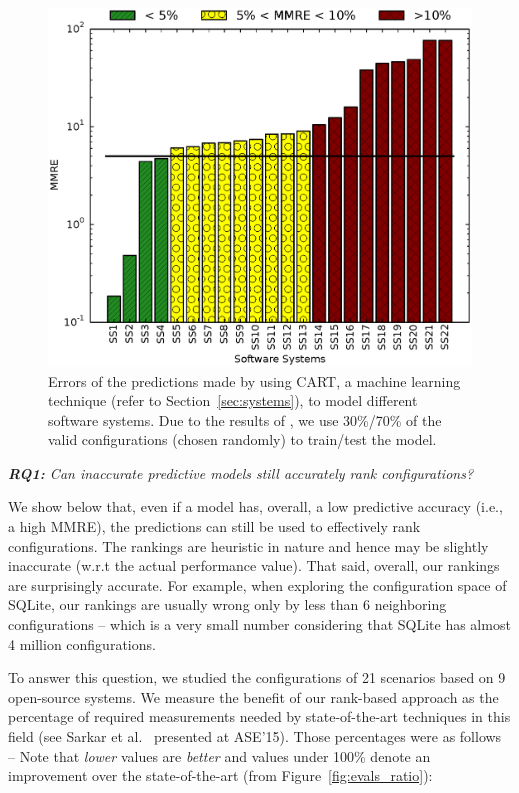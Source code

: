 \begin{figure}[t]
\centering
\includegraphics[scale=0.35]{Figures/figure1}
\caption{{\small Errors of the predictions made by using CART, a machine learning technique (refer to Section~\ref{sec:systems}), to model different
software systems. Due to the results of , we use  30\%/70\% of the  valid configurations (chosen randomly) to train/test the model. }
}
\label{fig:model_efficiency}
\end{figure}


  \noindent
  {\em  {\bf RQ1:}  Can  inaccurate predictive  models still accurately rank
configurations?}

We show below that,   even if a model has, overall, a low predictive accuracy (i.e., a high MMRE), the
predictions can still be used to effectively rank configurations.
The rankings are heuristic in nature and hence may be slightly inaccurate (w.r.t the actual performance value).
That said, overall, our rankings are surprisingly accurate. For example,
when exploring the configuration space of SQLite, our 
rankings are usually wrong only by less than 6 neighboring configurations -- which is a very small number
considering that SQLite has almost 4 million configurations.


To answer this question, we studied the configurations of 21 scenarios based on 9 open-source systems.
We measure the benefit of our rank-based approach
as  the percentage of required measurements
needed by state-of-the-art techniques in this field (see Sarkar et al.~\cite{sarkar2015cost} presented at ASE'15). Those percentages were as follows -- 
Note that {\em lower} values are {\em better} and values under 100\% denote
an improvement over  the state-of-the-art (from Figure~\ref{fig:evals_ratio}):  

